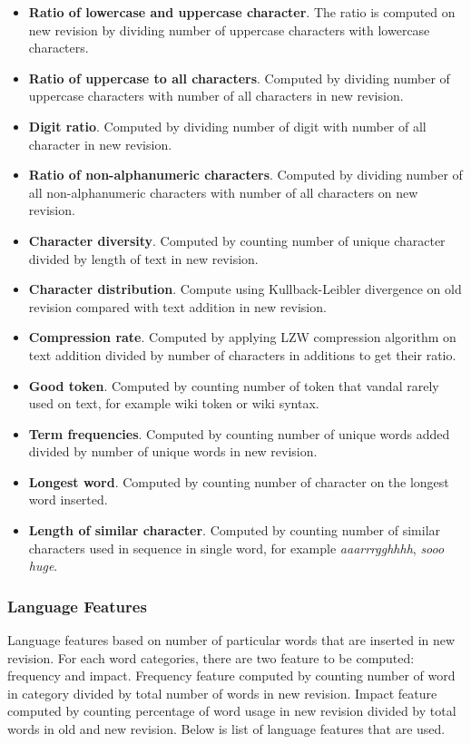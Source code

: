 \documentclass[conference,compsoc,a4paper,twocolumn,final]{IEEEtran}
\begin{document}
\begin{itemize}
\item \textbf{Ratio of lowercase and uppercase character}. The ratio is
computed on new revision by dividing number of uppercase characters with
lowercase characters.
\item \textbf{Ratio of uppercase to all characters}. Computed by dividing
number of uppercase characters with number of all characters in new revision.
\item \textbf{Digit ratio}. Computed by dividing number of digit with number of
all character in new revision.
\item \textbf{Ratio of non-alphanumeric characters}. Computed by dividing
number of all non-alphanumeric characters with number of all characters on new
revision.
\item \textbf{Character diversity}. Computed by counting number of unique
character divided by length of text in new revision.
\item \textbf{Character distribution}. Compute using Kullback-Leibler
divergence on old revision compared with text addition in new revision.
\item \textbf{Compression rate}. Computed by applying LZW compression algorithm
on text addition divided by number of characters in additions to get their
ratio.
\item \textbf{Good token}. Computed by counting number of token that vandal
rarely used on text, for example wiki token or wiki syntax.
\item \textbf{Term frequencies}. Computed by counting number of unique words
added divided by number of unique words in new revision.
\item \textbf{Longest word}. Computed by counting number of character on the
longest word inserted.
\item \textbf{Length of similar character}. Computed by counting number of
similar characters used in sequence in single word, for example
\textit{aaarrrgghhhh}, \textit{sooo huge}.
\end{itemize}

\subsubsection{Language Features}

Language features based on number of particular words that are inserted in new
revision.
For each word categories, there are two feature to be computed: frequency and
impact.
Frequency feature computed by counting number of word in category divided by
total number of words in new revision.
Impact feature computed by counting percentage of word usage in new revision
divided by total words in old and new revision.
Below is list of language features that are used.
\end{document}
